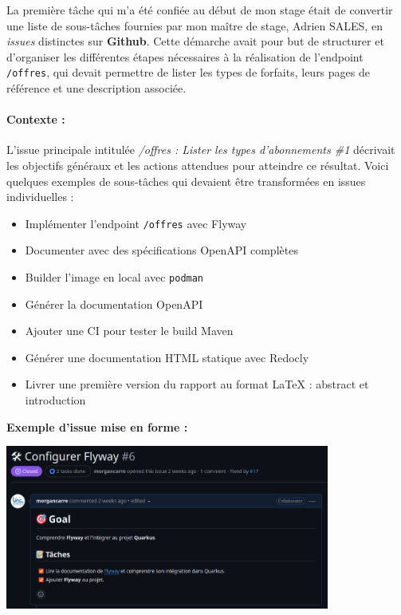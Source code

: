 \documentclass{article}
\begin{document}
	La première tâche qui m’a été confiée au début de mon stage était de convertir une liste de sous-tâches fournies par mon maître de stage, Adrien SALES, en \textit{issues} distinctes sur \textbf{Github}. Cette démarche avait pour but de structurer et d’organiser les différentes étapes nécessaires à la réalisation de l’endpoint \texttt{/offres}, qui devait permettre de lister les types de forfaits, leurs pages de référence et une description associée.
	
	\paragraph{Contexte : }
	
	L’issue principale intitulée \textit{/offres : Lister les types d'abonnements \#1} décrivait les objectifs généraux et les actions attendues pour atteindre ce résultat. Voici quelques exemples de sous-tâches qui devaient être transformées en issues individuelles :
	
	\begin{itemize}
		\item Implémenter l'endpoint \texttt{/offres} avec Flyway
		\item Documenter avec des spécifications OpenAPI complètes
		\item Builder l’image en local avec \texttt{podman}
		\item Générer la documentation OpenAPI
		\item Ajouter une CI pour tester le build Maven
		\item Générer une documentation HTML statique avec Redocly
		\item Livrer une première version du rapport au format \LaTeX{} : abstract et introduction
	\end{itemize}
	\begin{center}
		\textbf{Exemple d'issue mise en forme :}
	\end{center}
	
	\vspace{0.5cm}
	\begin{center}
		\includegraphics[width=0.8\textwidth]{asset/ex_issue.png}
	\end{center}
	
\end{document}
